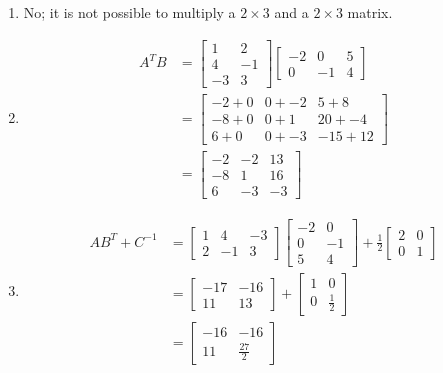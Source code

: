 \documentclass[a4paper]{article}
\begin{document}
\begin{enumerate}[label=(\alph*)]
    \item No; it is not possible to multiply a $2 \times 3$ and a $2 \times 3$ matrix.
    \item
        \begin{align*}
            A^TB &= \begin{bmatrix}1&2\\4&-1\\-3&3\end{bmatrix}
            \begin{bmatrix}-2&0&5\\0&-1&4\end{bmatrix} \\
            &= \begin{bmatrix}-2+0&0+-2&5+8\\-8+0&0+1&20+-4\\6+0&0+-3&-15+12\end{bmatrix} \\
            &= \begin{bmatrix}-2&-2&13\\-8&1&16\\6&-3&-3\end{bmatrix}
        \end{align*}
    \item 
        \begin{align*}
            AB^T + C^{-1} &=
            \begin{bmatrix}1&4&-3\\2&-1&3\end{bmatrix}
            \begin{bmatrix}-2&0\\0&-1\\5&4\end{bmatrix}
            + \frac{1}{2}\begin{bmatrix}2&0\\0&1\end{bmatrix} \\
            &= \begin{bmatrix}-17&-16\\11&13\end{bmatrix}
            + \begin{bmatrix}1&0\\0&\frac12\end{bmatrix} \\
            &= \begin{bmatrix}-16&-16\\11&\frac{27}2\end{bmatrix}
        \end{align*}
        

\end{enumerate}
\end{document}
